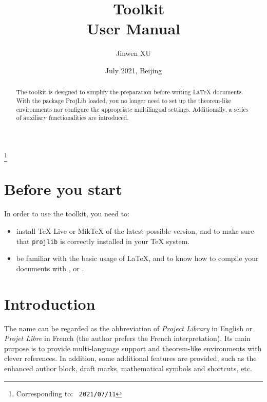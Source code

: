 \documentclass[English,Chinese,French,allowbf,puretext]{lebhart}
\providecommand{\ProjLibPackage}{\mbox{\textsf{ProjLib}}}
\begin{document}
\title{\ProjLib{}~\,Toolkit\\[.3\baselineskip]\normalsize User Manual}
\author{Jinwen XU}
\thanks{Corresponding to: \texttt{\ProjLib{}~2021/07/11}}
\date{July 2021, Beijing}

\maketitle

\begin{abstract}
    The \ProjLib{} toolkit is designed to simplify the preparation before writing \LaTeX{} documents. With the package \ProjLibPackage{} loaded, you no longer need to set up the theorem-like environments nor configure the appropriate multilingual settings. Additionally, a series of auxiliary functionalities are introduced.
\end{abstract}

\begin{multicols}{2}
    \small
    \tableofcontents
\end{multicols}

\medskip

\section*{Before you start}

In order to use the toolkit, you need to:
\begin{itemize}
     \item install TeX Live or MikTeX of the latest possible version, and to make sure that \texttt{projlib} is correctly installed in your \TeX{} system.
     \item be familiar with the basic usage of \LaTeX{}, and to know how to compile your documents with ,  or .
\end{itemize}

\section{Introduction}

The name \ProjLib{} can be regarded as the abbreviation of \emph{Project Library} in English or \emph{Projet Libre} in French (the author prefers the French interpretation). Its main purpose is to provide multi-language support and theorem-like environments with clever references. In addition, some additional features are provided, such as the enhanced author block, draft marks, mathematical symbols and shortcuts, etc.
\end{document}
